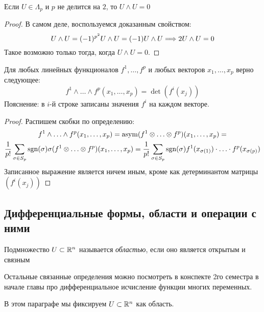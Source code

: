 \begin{corollary}
	Если $U \in \Lambda_p$ и $p$ не делится на $2$, то $U \wedge U = 0$
\end{corollary}

\begin{proof}
	В самом деле, воспользуемся доказанным свойством:
	\[
		U \wedge U = (-1)^{p^2} U \wedge U = (-1) U \wedge U \Longrightarrow 2U \wedge U = 0
	\]
	Такое возможно только тогда, когда $U \wedge U = 0$.
\end{proof}

\begin{lemma}
	Для любых линейных функционалов $f^1, \ldots, f^p$ и любых векторов $x_1, \ldots, x_p$ верно следующее:
	\[
	f^1 \wedge \ldots \wedge f^p(x_1, \ldots, x_p) = \det(f^i(x_j))
	\]
	Пояснение: в $i$-й строке записаны значения $f^i$ на каждом векторе.
\end{lemma}

\begin{proof}
	Распишем скобки по определению:
	\begin{multline*}
	f^1 \wedge \ldots \wedge f^p(x_1, \ldots, x_p) = \operatorname{asym}(f^1 \otimes \ldots \otimes f^p)(x_1, \ldots, x_p) =
	\\
	\frac{1}{p!} \sum_{\sigma \in S_p} \operatorname{sgn}(\sigma) \sigma (f^1 \otimes \ldots \otimes f^p)(x_1, \ldots, x_p) = \frac{1}{p!} \sum_{\sigma \in S_p} \operatorname{sgn}(\sigma) f^1(x_{\sigma(1)}) \cdot \ldots \cdot f^p(x_{\sigma(p)})
	\end{multline*}
	Записанное выражение является ничем иным, кроме как детерминантом матрицы $(f^i(x_j))$
\end{proof}

\subsection{Дифференциальные формы, области и операции с ними}

\begin{reminder}
	Подмножество $U \subset \mathbb{R}^n$ называется \textit{областью}, если оно является открытым и связным
\end{reminder}

\begin{anote}
	Остальные связанные определения можно посмотреть в конспекте 2го семестра в начале главы про дифференциальное исчисление функции многих переменных.
\end{anote}

\begin{note}
	В этом параграфе мы фиксируем $U \subset \mathbb{R}^n$ как область.
\end{note}

